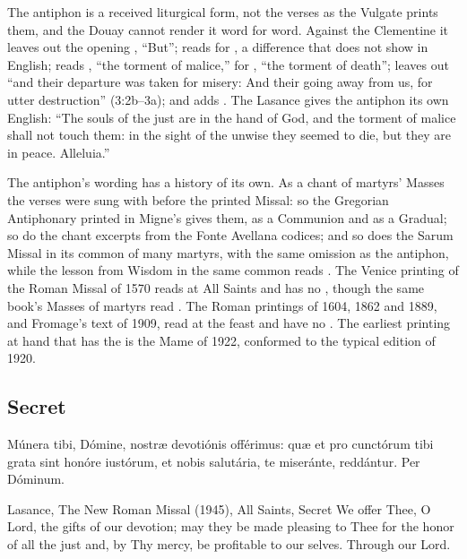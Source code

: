 \noindent The antiphon is a received liturgical form, not the verses as the
Vulgate prints them, and the Douay cannot render it word for word. Against
the Clementine it leaves out the opening , ``But''; reads
 for , a difference that does not show in
English; reads , ``the torment of malice,'' for
, ``the torment of death''; leaves out ``and their
departure was taken for misery: And their going away from us, for utter
destruction'' (3:2b--3a); and adds . The Lasance gives the
antiphon its own English: ``The souls of the just are in the hand of God, and
the torment of malice shall not touch them: in the sight of the unwise they
seemed to die, but they are in peace. Alleluia.''

The antiphon's wording has a history of its own. As a chant of martyrs'
Masses the verses were sung with  before the printed Missal:
so the Gregorian Antiphonary printed in Migne's 
gives them, as a Communion and as a Gradual; so do the chant excerpts from
the Fonte Avellana codices; and so does the Sarum Missal in its common of many
martyrs, with the same omission as the antiphon, while the lesson from Wisdom
in the same common reads . The Venice printing of the Roman
Missal of 1570 reads  at All Saints and has no
, though the same book's Masses of martyrs read
. The Roman printings of 1604, 1862 and 1889, and Fromage's
text of 1909, read  at the feast and have no .
The earliest printing at hand that has the  is the Mame of
1922, conformed to the typical edition of 1920.
\subsection{Secret}
\label{proper-secret}


\begin{latinproper}
Múnera tibi, Dómine, nostræ devotiónis offérimus: quæ et pro cunctórum
tibi grata sint honóre iustórum, et nobis salutária, te miseránte,
reddántur. Per Dóminum.
\end{latinproper}

\begin{englishwitness}{Lasance, The New Roman Missal (1945), All Saints, Secret}
We offer Thee, O Lord, the gifts of our devotion; may they be made pleasing to
Thee for the honor of all the just and, by Thy mercy, be profitable to our
selves. Through our Lord.
\end{englishwitness}


